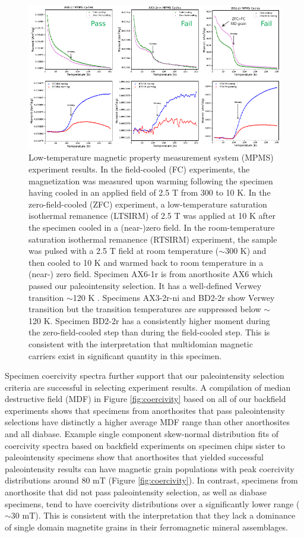 \documentclass[9pt,twocolumn,twoside,lineno]{pnas-new}
\begin{document}
\begin{figure}[h!]
\noindent\includegraphics[width=\textwidth]{MPMS.pdf}
\centering
\caption{\footnotesize{Low-temperature magnetic property measurement system (MPMS) experiment results. In the field-cooled (FC) experiments, the magnetization was measured upon warming following the specimen having cooled in an applied field of 2.5 T from 300 to 10 K. In the zero-field-cooled (ZFC) experiment, a low-temperature saturation isothermal remanence (LTSIRM) of 2.5 T was applied at 10 K after the specimen cooled in a (near-)zero field. In the room-temperature saturation isothermal remanence (RTSIRM) experiment, the sample was pulsed with a 2.5 T field at room temperature ($\sim$300 K) and then cooled to 10 K and warmed back to room temperature in a (near-) zero field. Specimen AX6-1r is from anorthosite AX6 which passed our paleointensity selection. It has a well-defined Verwey transition $\sim$120 K \cite{Verwey1939a}. Specimens AX3-2r-ni and BD2-2r show Verwey transition but the transition temperatures are suppressed below $\sim$120 K. Specimen BD2-2r has a consistently higher moment during the zero-field-cooled step than during the field-cooled step. This is consistent with the interpretation that multidomian magnetic carriers exist in significant quantity in this specimen.}}
\label{fig:MPMS}
\end{figure}

Specimen coercivity spectra further support that our paleointensity selection criteria are successful in selecting experiment results. A compilation of median destructive field (MDF) in Figure \ref{fig:coercivity} based on all of our backfield experiments shows that specimens from anorthosites that pass paleointensity selections have distinctly a higher average MDF range than other anorthosites and all diabase. Example single component skew-normal distribution fits of coercivity spectra based on backfield experiments on specimen chips sister to paleointensity specimens show that anorthosites that yielded successful paleointensity results can have magnetic grain populations with peak coercivity distributions around 80 mT (Figure \ref{fig:coercivity}). In contrast, specimens from anorthosite that did not pass paleointensity selection, as well as diabase specimens, tend to have coercivity distributions over a significantly lower range ($\sim$30 mT). This is consistent with the interpretation that they lack a dominance of single domain magnetite grains in their ferromagnetic mineral assemblages.
\end{document}
